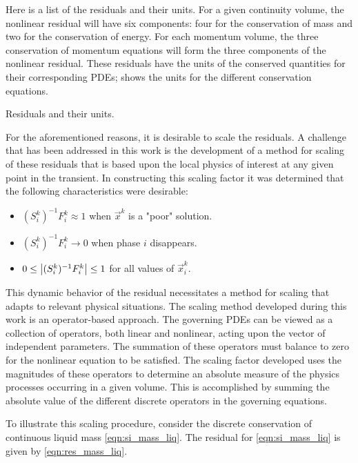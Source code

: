 Here is a list of the residuals and their units.
For a given continuity volume, the nonlinear residual will have six components: four for the conservation of mass and two for the conservation of energy.
For each momentum volume, the three conservation of momentum equations will form the three components of the nonlinear residual.
These residuals have the units of the conserved quantities for their corresponding PDEs;  shows the units for the different conservation equations.

\begin{table}[ht]
\centering

\caption{Residuals and their units.}
\label{tab:scaling_units_scales}
\end{table}

For the aforementioned reasons, it is desirable to scale the residuals.
A challenge that has been addressed in this work is the development of a method for scaling of these residuals that is based upon the local physics of interest at any given point in the transient.
In constructing this scaling factor it was determined that the following characteristics were desirable:

\begin{itemize}
\item{$(S_{i}^{k})^{-1} F^{k}_i \approx 1$ when $\vec{x}^{k}$ is a "poor" solution.}
\item{$(S_{i}^{k})^{-1} F^{k}_i \rightarrow 0$ when phase $i$ disappears.}
\item{$0 \leq \left|(S_{i}^{k})^{-1} F^{k}_{i}\right| \leq 1 $ for all values of $\vec{x}^{k}_i$.}
\end{itemize}

This dynamic behavior of the residual necessitates a method for scaling that adapts to relevant physical situations.
The scaling method developed during this work is an operator-based approach.
The governing PDEs can be viewed as a collection of operators, both linear and nonlinear, acting upon the vector of independent parameters.
The summation of these operators must balance to zero for the nonlinear equation to be satisfied.
The scaling factor developed uses the magnitudes of these operators to determine an absolute measure of the physics processes occurring in a given volume.
This is accomplished by summing the absolute value of the different discrete operators in the governing equations. 

To illustrate this scaling procedure, consider the discrete conservation of continuous liquid mass \eqref{eqn:si_mass_liq}.
The residual for \eqref{eqn:si_mass_liq} is given by \eqref{eqn:res_mass_liq}.

